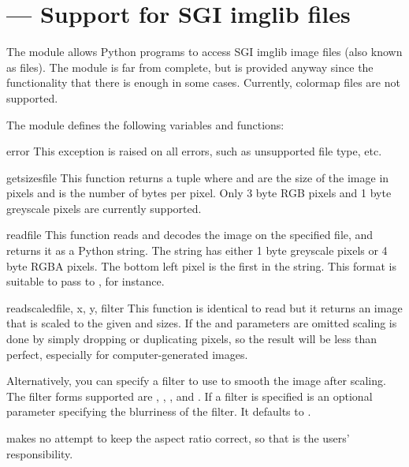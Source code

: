 \section{ ---
         Support for SGI imglib files}



The  module allows Python programs to access SGI imglib image
files (also known as  files).  The module is far from
complete, but is provided anyway since the functionality that there is
enough in some cases.  Currently, colormap files are not supported.

The module defines the following variables and functions:

\begin{excdesc}{error}
This exception is raised on all errors, such as unsupported file type, etc.
\end{excdesc}

\begin{funcdesc}{getsizes}{file}
This function returns a tuple  where
 and  are the size of the image in pixels and
 is the number of
bytes per pixel. Only 3 byte RGB pixels and 1 byte greyscale pixels
are currently supported.
\end{funcdesc}

\begin{funcdesc}{read}{file}
This function reads and decodes the image on the specified file, and
returns it as a Python string. The string has either 1 byte greyscale
pixels or 4 byte RGBA pixels. The bottom left pixel is the first in
the string. This format is suitable to pass to ,
for instance.
\end{funcdesc}

\begin{funcdesc}{readscaled}{file, x, y, filter}
This function is identical to read but it returns an image that is
scaled to the given  and  sizes. If the  and
 parameters are omitted scaling is done by
simply dropping or duplicating pixels, so the result will be less than
perfect, especially for computer-generated images.

Alternatively, you can specify a filter to use to smooth the image
after scaling. The filter forms supported are ,
, ,  and
. If a filter is specified  is an optional
parameter specifying the blurriness of the filter. It defaults to .

 makes no attempt to keep the aspect ratio
correct, so that is the users' responsibility.
\end{funcdesc}

